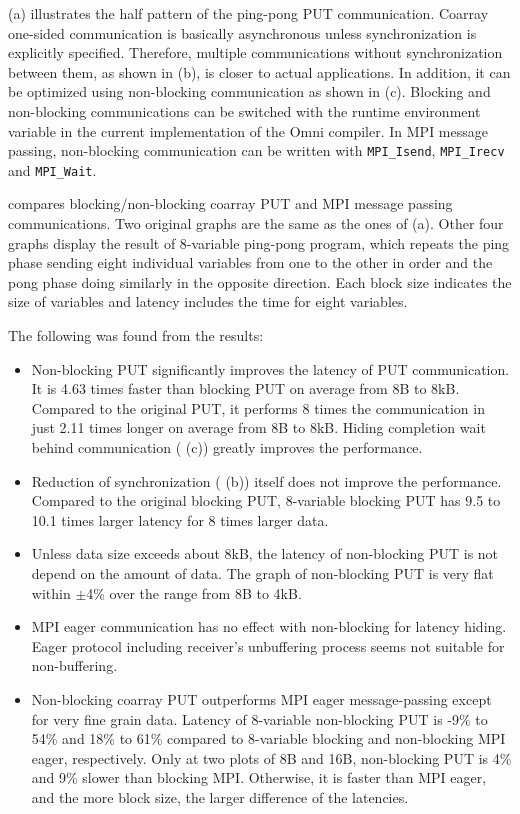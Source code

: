  (a) illustrates the half pattern of the ping-pong PUT communication.
Coarray one-sided communication is basically asynchronous unless 
synchronization is explicitly specified. Therefore, multiple communications
without synchronization between them, as shown in (b), is closer to actual applications.
In addition, it can be optimized using non-blocking communication as shown in (c).
Blocking and non-blocking communications can be switched with the runtime environment
variable in the current implementation of the Omni compiler.
In MPI message passing, non-blocking communication can be written with 
{\tt MPI\_Isend}, {\tt MPI\_Irecv} and {\tt MPI\_Wait}.


 compares blocking/non-blocking coarray PUT and 
MPI message passing communications.
Two original graphs are the same as the ones of  (a).
Other four graphs display the result of 8-variable ping-pong program, 
which repeats the ping phase sending eight individual variables 
from one to the other in order and the pong phase doing similarly 
in the opposite direction.
Each block size indicates the size of variables and latency includes the
time for eight variables.

The following was found from the results:
\begin{itemize}
\item
Non-blocking PUT significantly improves the latency of PUT communication. 
It is 4.63 times faster than blocking PUT on average from 8B to 8kB. 
Compared to the original PUT, it performs 8 times the communication in just 
2.11 times longer on average from 8B to 8kB.
Hiding completion wait behind communication ( (c))
greatly improves the performance.

\item
Reduction of synchronization ( (b)) itself does not
improve the performance. Compared to the original blocking PUT, 
8-variable blocking PUT has 9.5 to 10.1 times larger latency for 8 times
larger data.

\item
Unless data size exceeds about 8kB, the latency of non-blocking PUT is not
depend on the amount of data. 
The graph of non-blocking PUT is very flat within $\pm$4\% over the range 
from 8B to 4kB.

\item 
MPI eager communication has no effect with non-blocking for latency hiding.
Eager protocol including receiver's unbuffering process seems not suitable for
non-buffering.

\item 
Non-blocking coarray PUT outperforms MPI eager message-passing
except for very fine grain data.
Latency of 8-variable non-blocking PUT is  -9\% to 54\% and 18\% to 61\% 
compared to 8-variable blocking and non-blocking MPI eager, respectively.
Only at two plots of 8B and 16B, non-blocking PUT is 4\% and 9\% slower 
than blocking MPI. Otherwise, it is faster than MPI eager, and
the more block size, the larger difference of the latencies.

\end{itemize}


